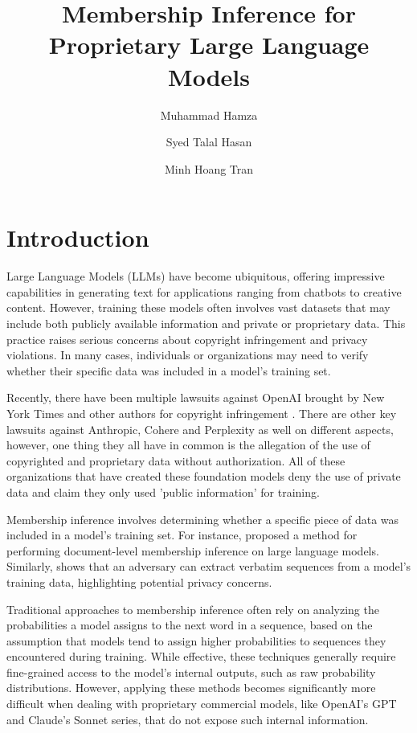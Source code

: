 \documentclass[sigconf]{acmart}
\title{Membership Inference for Proprietary Large Language Models}
\author{Muhammad Hamza}
\affiliation{%
  \institution{Virginia Polytechnic Institute and State University}
  \city{Blacksburg}
  \state{VA}
  \country{USA}
}
\author{Syed Talal Hasan}
\affiliation{%
  \institution{Virginia Polytechnic Institute and State University}
  \city{Blacksburg}
  \state{VA}
  \country{USA}
}
\author{Minh Hoang Tran}
\affiliation{%
  \institution{Virginia Polytechnic Institute and State University}
  \city{Blacksburg}
  \state{VA}
  \country{USA}
}
\newcommand{\todo}[1]{\textcolor{red}{\textbf{TODO:} #1}}
\begin{document}


\maketitle


\section{Introduction}


Large Language Models (LLMs) have become ubiquitous, offering impressive capabilities in generating text for applications ranging from chatbots to creative content. However, training these models often involves vast datasets that may include both publicly available information and private or proprietary data. This practice raises serious concerns about copyright infringement and privacy violations. In many cases, individuals or organizations may need to verify whether their specific data was included in a model’s training set.

Recently, there have been multiple lawsuits against OpenAI brought by New York Times and other authors for copyright infringement \cite{key}. There are other key lawsuits against Anthropic, Cohere and Perplexity as well on different aspects, however, one thing they all have in common is the allegation of the use of copyrighted and proprietary data without authorization. All of these organizations that have created these foundation models deny the use of private data and claim they only used 'public information' for training. 

Membership inference involves determining whether a specific piece of data was included in a model’s training set. For instance, \cite{neurons_read_your_book} proposed a method for performing document-level membership inference on large language models. Similarly, \cite{extracting_training_data_llm} shows that an adversary can extract verbatim sequences from a model’s training data, highlighting potential privacy concerns. 

Traditional approaches to membership inference often rely on analyzing the probabilities a model assigns to the next word in a sequence, based on the assumption that models tend to assign higher probabilities to sequences they encountered during training. While effective, these techniques generally require fine-grained access to the model’s internal outputs, such as raw probability distributions. However, applying these methods becomes significantly more difficult when dealing with proprietary commercial models, like OpenAI’s GPT and Claude’s Sonnet series, that do not expose such internal information.
\end{document}
